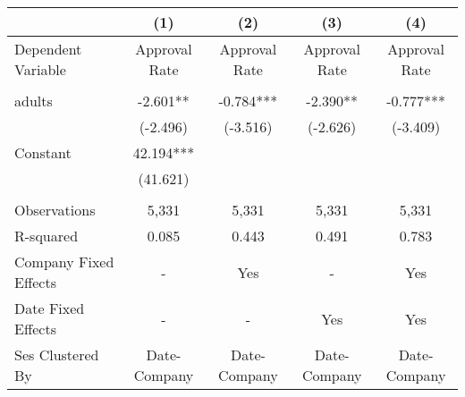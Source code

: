 \begin{tabular}{lcccc}
\toprule
{} &            (1) &            (2) &            (3) &            (4) \\
\midrule
Dependent Variable    &  Approval Rate &  Approval Rate &  Approval Rate &  Approval Rate \\
                      &                &                &                &                \\
adults                &       -2.601** &      -0.784*** &       -2.390** &      -0.777*** \\
                      &       (-2.496) &       (-3.516) &       (-2.626) &       (-3.409) \\
Constant              &      42.194*** &                &                &                \\
                      &       (41.621) &                &                &                \\
                      &                &                &                &                \\
Observations          &          5,331 &          5,331 &          5,331 &          5,331 \\
R-squared             &          0.085 &          0.443 &          0.491 &          0.783 \\
Company Fixed Effects &              - &            Yes &              - &            Yes \\
Date Fixed Effects    &              - &              - &            Yes &            Yes \\
Ses Clustered By      &   Date-Company &   Date-Company &   Date-Company &   Date-Company \\
\bottomrule
\end{tabular}
